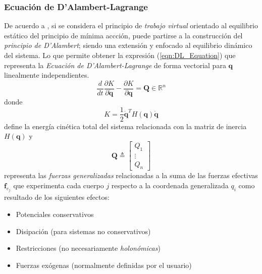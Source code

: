     \subsubsection{Ecuación de D'Alambert-Lagrange}
    De acuerdo a \cite{3DMotion}, si se considera el principio de \emph{trabajo virtual} orientado al equilibrio estático del principio de mínima accción, puede partirse a la
    construcción del \emph{principio de D'Alambert}; siendo una extensión y enfocado al equilibrio dinámico del sistema.  Lo que permite obtener la
    expresión (\ref{eqn:DL_Equation}) que representa la \emph{Ecuación de D'Alambert-Lagrange} de forma vectorial para $\boldsymbol{q}$ linealmente
    independientes.
    \begin{equation} 
        \label{eqn:DL_Equation}
         \frac{d}{dt} \frac{\partial K}{\partial \boldsymbol{\dot{q}}} - \frac{\partial K}{\partial \boldsymbol{q}} = \boldsymbol{Q}
         \in \mathbb{R}^n
    \end{equation}
    donde
    \begin{equation}
        \label{eqn:kinetic_energy}
         K = \frac{1}{2} \boldsymbol{\dot{q}}^T H(\boldsymbol{q}) \boldsymbol{\dot{q}}
    \end{equation}
    define la energía cinética total del sistema relacionada con la matriz de inercia $H(\boldsymbol{q})$ y 
    \begin{equation}
        \label{eqn:fuerzas_generalizadas}
         \boldsymbol{Q} \triangleq \begin{bmatrix} Q_1 \\ \vdots \\ Q_n \end{bmatrix}
    \end{equation}
    representa las \emph{fuerzas generalizadas}
    relacionadas a la suma de las fuerzas efectivas $\boldsymbol{f}_{e_j}$ que experimenta cada cuerpo $j$ respecto a la coordenada generalizada $q_i$
    como resultado de los siguientes efectos:
    \begin{itemize}
        \item Potenciales conservativos
        \item Disipación (para sistemas no conservativos)
        \item Restricciones (no necesariamente \emph{holonómicas})
        \item Fuerzas exógenas (normalmente definidas por el usuario)
    \end{itemize}

